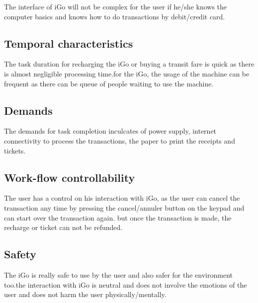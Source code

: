 \documentclass[12pt]{report}
\begin{document}
The interface of iGo will not be complex for the user if he/she knows the computer basics and knows how to do transactions by debit/credit card.\par


\vspace{\baselineskip}
\subsection{Temporal characteristics}

The task duration for recharging the iGo or buying a transit fare is quick as there is almost negligible processing time.for the iGo, the usage of the machine can be frequent as there can be queue of people waiting to use the machine.\par

\subsection{Demands}

The demands for task completion inculcates of power supply, internet connectivity to process the transactions, the paper to print the receipts and tickets.\par



\vspace{\baselineskip}
\subsection{Work-flow controllability}

The user has a control on his interaction with iGo, as the user can cancel the transaction any time by pressing the cancel/annuler button on the keypad and  can start over the transaction again. but once the transaction is made, the recharge or ticket can not be refunded.\par

\subsection{Safety}

The iGo is really safe to use by the user and also safer for the environment too.the interaction with iGo is neutral and does not involve the emotions of the user and does not harm the user physically/mentally.\par


\vspace{\baselineskip}
\end{document}
